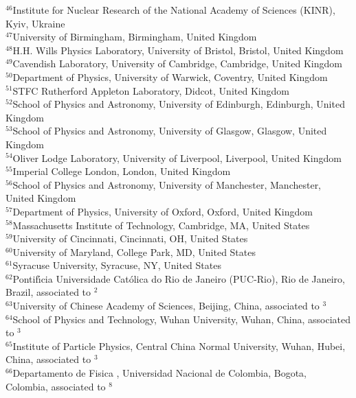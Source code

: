 \begin{flushleft}
{$ ^{46}$Institute for Nuclear Research of the National Academy of Sciences (KINR), Kyiv, Ukraine\\
$ ^{47}$University of Birmingham, Birmingham, United Kingdom\\
$ ^{48}$H.H. Wills Physics Laboratory, University of Bristol, Bristol, United Kingdom\\
$ ^{49}$Cavendish Laboratory, University of Cambridge, Cambridge, United Kingdom\\
$ ^{50}$Department of Physics, University of Warwick, Coventry, United Kingdom\\
$ ^{51}$STFC Rutherford Appleton Laboratory, Didcot, United Kingdom\\
$ ^{52}$School of Physics and Astronomy, University of Edinburgh, Edinburgh, United Kingdom\\
$ ^{53}$School of Physics and Astronomy, University of Glasgow, Glasgow, United Kingdom\\
$ ^{54}$Oliver Lodge Laboratory, University of Liverpool, Liverpool, United Kingdom\\
$ ^{55}$Imperial College London, London, United Kingdom\\
$ ^{56}$School of Physics and Astronomy, University of Manchester, Manchester, United Kingdom\\
$ ^{57}$Department of Physics, University of Oxford, Oxford, United Kingdom\\
$ ^{58}$Massachusetts Institute of Technology, Cambridge, MA, United States\\
$ ^{59}$University of Cincinnati, Cincinnati, OH, United States\\
$ ^{60}$University of Maryland, College Park, MD, United States\\
$ ^{61}$Syracuse University, Syracuse, NY, United States\\
$ ^{62}$Pontif{\'\i}cia Universidade Cat{\'o}lica do Rio de Janeiro (PUC-Rio), Rio de Janeiro, Brazil, associated to $^{2}$\\
$ ^{63}$University of Chinese Academy of Sciences, Beijing, China, associated to $^{3}$\\
$ ^{64}$School of Physics and Technology, Wuhan University, Wuhan, China, associated to $^{3}$\\
$ ^{65}$Institute of Particle Physics, Central China Normal University, Wuhan, Hubei, China, associated to $^{3}$\\
$ ^{66}$Departamento de Fisica , Universidad Nacional de Colombia, Bogota, Colombia, associated to $^{8}$\\
}
\end{flushleft}
